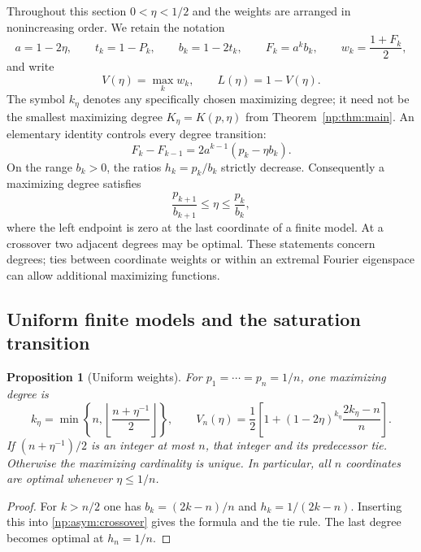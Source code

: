 \documentclass[11pt,a4paper]{article}
\newtheorem{proposition}[theorem]{Proposition}
\theoremstyle{definition}
\theoremstyle{remark}
\begin{document}
Throughout this section $0<\eta<1/2$ and the weights are arranged in nonincreasing order.
We retain the notation
\[
 a=1-2\eta,\qquad t_k=1-P_k,\qquad b_k=1-2t_k,
 \qquad F_k=a^k b_k,\qquad w_k=\frac{1+F_k}{2},
\]
and write
\[
 V(\eta)=\max_k w_k,\qquad L(\eta)=1-V(\eta).
\]
The symbol $k_\eta$ denotes any specifically chosen maximizing degree;
it need not be the smallest maximizing degree $K_\eta=K(p,\eta)$ from Theorem~\ref{np:thm:main}.
An elementary identity controls every degree transition:
\begin{equation}
 F_k-F_{k-1}=2a^{k-1}(p_k-\eta b_k).
 \label{np:asym:increment}
\end{equation}
On the range $b_k>0$, the ratios $h_k=p_k/b_k$ strictly decrease.
Consequently a maximizing degree satisfies
\begin{equation}
 \frac{p_{k+1}}{b_{k+1}}\leq\eta\leq\frac{p_k}{b_k},
 \label{np:asym:crossover}
\end{equation}
where the left endpoint is zero at the last coordinate of a finite model.
At a crossover two adjacent degrees may be optimal.  These statements
concern degrees; ties between coordinate weights or within an extremal
Fourier eigenspace can allow additional maximizing functions.

\subsection{Uniform finite models and the saturation transition}
\label{np:asym:uniform}

\begin{proposition}[Uniform weights]
\label{np:asym:uniform-exact}
For $p_1=\cdots=p_n=1/n$, one maximizing degree is
\begin{equation}
 k_\eta=\min\left\{n,
       \left\lfloor\frac{n+\eta^{-1}}2\right\rfloor\right\},
 \qquad
 V_n(\eta)=\frac12\left[1+(1-2\eta)^{k_\eta}
                              \frac{2k_\eta-n}{n}\right].
 \label{np:asym:uniform-formula}
\end{equation}
If $(n+\eta^{-1})/2$ is an integer at most $n$, that integer and its
predecessor tie.  Otherwise the maximizing cardinality is unique.
In particular, all $n$ coordinates are optimal whenever $\eta\leq1/n$.
\end{proposition}

\begin{proof}
For $k>n/2$ one has $b_k=(2k-n)/n$ and
$h_k=1/(2k-n)$.  Inserting this into
\eqref{np:asym:crossover} gives the formula and the tie rule.
The last degree becomes optimal at $h_n=1/n$.
\end{proof}
\end{document}
